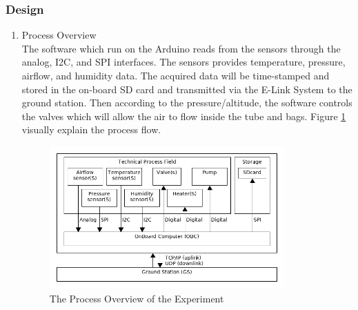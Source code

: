 \documentclass[a4paper,12pt,twoside]{article}
\providecommand{\DIFaddtex}[1]{{\protect\color{blue}\uwave{#1}}} %
\providecommand{\DIFaddFL}[1]{\DIFadd{#1}} %
\providecommand{\DIFaddbeginFL}{} %
\providecommand{\DIFaddendFL}{} %
\providecommand{\DIFadd}[1]{\texorpdfstring{\DIFaddtex{#1}}{#1}} %
\newcommand{\DIFaddincludegraphics}[2][]{{\color{blue}\fbox{\DIFOincludegraphics[#1]{#2}}}} %
\DeclareRobustCommand{\DIFaddbeginFL}{\DIFOaddbeginFL \let\includegraphics\DIFaddincludegraphics} %
\DeclareRobustCommand{\DIFaddendFL}{\DIFOaddendFL \let\includegraphics\DIFOincludegraphics} %
\begin{document}
\subsubsection{Design} \label{sec:4.8.2}
\begin{enumerate}[label=(\alph*)]
\item{Process Overview}\\
The software which run on the Arduino reads from the sensors through the analog, I2C, and SPI interfaces. The sensors provides temperature, pressure, airflow, and humidity data. The acquired data will be time-stamped and stored in the on-board SD card and transmitted via the E-Link System to the ground station. Then according to the pressure/altitude, the software controls the valves which will allow the air to flow inside the tube and bags. Figure \ref{processOverview} visually explain the process flow.

\begin{figure}[H]
    \centering
    \includegraphics[width=0.85\textwidth]{4-experiment-design/img/Process-overview-V0-2.png}
    \caption{The Process Overview of the Experiment\DIFaddbeginFL \DIFaddFL{.}\DIFaddendFL }
    \label{processOverview}
\end{figure}


\end{enumerate}
\end{document}
